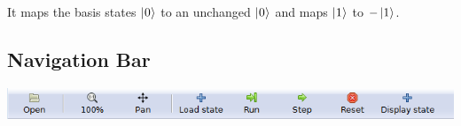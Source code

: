 \documentclass[10pt]{article}
\theoremstyle{definition}
\newcommand{\microspace}{\mspace{0.5mu}}
\def \lket {\left|}
\def \rket {\right\rangle}
\newcommand{\ket}[1]{\lket\microspace #1 \microspace\rket}
\begin{document}
\begin{itemize}
It maps the basis states $\ket{0}$ to an unchanged $\ket{0}$ and maps $\ket{1}$ to $-\ket{1}$. 

\end{itemize}

\subsection{Navigation Bar}\label{sub:NavigationBar}

\begin{center}
\includegraphics{Figures/Navigation/NavigationBar.png}
\end{center}
\end{document}
